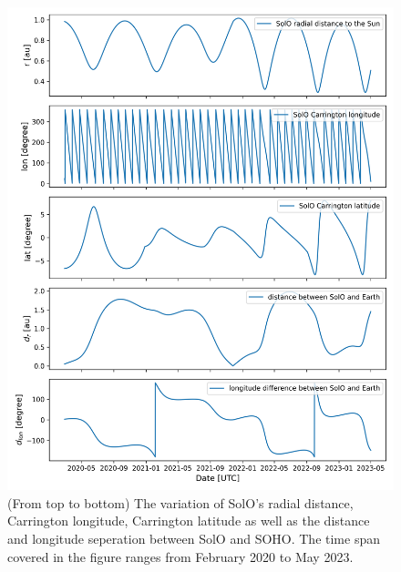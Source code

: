 \begin{figure}
    \centering
    \includegraphics[width = \textwidth]{images/ACR/SOLO_orbit_helioscentric_3.png}
    \caption[The orbit variation of \ac{SolO} in carrington coordinate system]{(From top to bottom) The variation of \ac{SolO}'s radial distance, Carrington longitude, Carrington latitude as well as the distance and longitude seperation between \ac{SolO} and \ac{SOHO}. The time span covered in the figure ranges from February 2020 to May 2023. }
    \label{fig:SOLO_orbit_info}
\end{figure}
